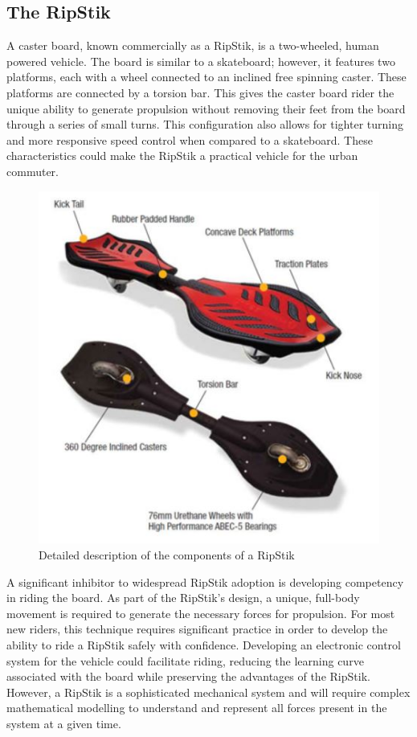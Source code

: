 \documentclass[12pt,letterpaper]{article}
\begin{document}
\subsection{The RipStik}
A caster board, known commercially as a RipStik, is a two-wheeled, human powered vehicle. 
The board is similar to a skateboard; however, it features two platforms, each with a wheel connected to an inclined free spinning caster. 
These platforms are connected by a torsion bar. 
This gives the caster board rider the unique ability to generate propulsion without removing their feet from the board through a series of small turns. 
This configuration also allows for tighter turning and more responsive speed control when compared to a skateboard. 
These characteristics could make the RipStik a practical vehicle for the urban commuter.
\begin{figure}[!htb]
	\centering
	\includegraphics[width=\linewidth]{RipStik.JPG}
	\caption{Detailed description of the components of a RipStik \cite{PIC}}\label{fig:RipStik}
	\endminipage
\end{figure}
\par
A significant inhibitor to widespread RipStik adoption is developing competency in riding the board. 
As part of the RipStik’s design, a unique, full-body movement is required to generate the necessary forces for propulsion. 
For most new riders, this technique requires significant practice in order to develop the ability to ride a RipStik safely with confidence. 
Developing an electronic control system for the vehicle could facilitate riding, reducing the learning curve associated with the board while preserving the advantages of the RipStik. 
However, a RipStik is a sophisticated mechanical system and will require complex mathematical modelling to understand and represent all forces present in the system at a given time.
\end{document}
